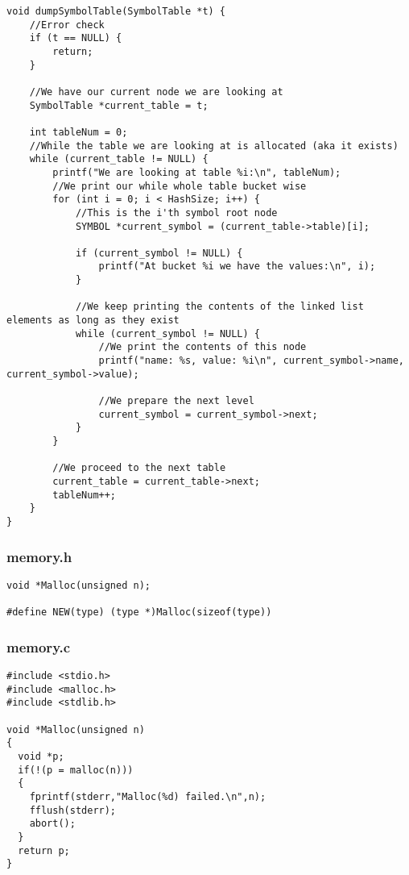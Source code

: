 \documentclass[a4paper]{article}
\begin{document}
\begin{verbatim}
void dumpSymbolTable(SymbolTable *t) {
    //Error check
    if (t == NULL) {
        return;
    }

    //We have our current node we are looking at
    SymbolTable *current_table = t;

    int tableNum = 0;
    //While the table we are looking at is allocated (aka it exists)
    while (current_table != NULL) {
        printf("We are looking at table %i:\n", tableNum);
        //We print our while whole table bucket wise
        for (int i = 0; i < HashSize; i++) {
            //This is the i'th symbol root node
            SYMBOL *current_symbol = (current_table->table)[i];

            if (current_symbol != NULL) {
                printf("At bucket %i we have the values:\n", i);
            }

            //We keep printing the contents of the linked list elements as long as they exist
            while (current_symbol != NULL) {
                //We print the contents of this node
                printf("name: %s, value: %i\n", current_symbol->name, current_symbol->value);

                //We prepare the next level
                current_symbol = current_symbol->next;
            }
        }

        //We proceed to the next table
        current_table = current_table->next;
        tableNum++;
    }
}
\end{verbatim}

\subsubsection{memory.h}
\begin{verbatim}
void *Malloc(unsigned n);

#define NEW(type) (type *)Malloc(sizeof(type))
\end{verbatim}

\subsubsection{memory.c}
\begin{verbatim}
#include <stdio.h>
#include <malloc.h>
#include <stdlib.h>

void *Malloc(unsigned n)
{
  void *p;
  if(!(p = malloc(n)))
  {
    fprintf(stderr,"Malloc(%d) failed.\n",n);
    fflush(stderr);
    abort();
  }
  return p;
}
\end{verbatim}
\end{document}
